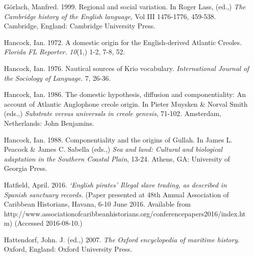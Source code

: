 \begin{styleStandard}
Görlach, Manfred. 1999.\textit{ }Regional and social variation.\textit{ }In Roger Lass, (ed.,)\textit{ The Cambridge} \textit{history of the English language, }Vol III\textit{ }1476-1776\textit{, }459-538.\textit{ }Cambridge, England: Cambridge University Press.
\end{styleStandard}


\begin{styleStandard}
Hancock, Ian. 1972. A domestic origin for the English-derived Atlantic Creoles. \textit{Florida FL Reporter. 10}(1,) 1-2, 7-8, 52.
\end{styleStandard}


\begin{styleStandard}
Hancock, Ian. 1976. Nautical sources of Krio vocabulary. \textit{International Journal of the} \textit{Sociology of Language. }7, 26-36.
\end{styleStandard}


\begin{styleStandard}
Hancock, Ian. 1986. The domestic hypothesis, diffusion and componentiality: An account of Atlantic Anglophone creole origin. In Pieter Muysken \& Norval Smith (eds.,) \textit{Substrate versus universals in creole genesis}, 71-102\textit{. }Amsterdam, Netherlands: John Benjamins.
\end{styleStandard}


\begin{styleStandard}
Hancock, Ian. 1988. Componentiality and the origins of Gullah. In James L. Peacock \& James C. Sabella (eds.,) \textit{Sea and land: Cultural and biological adaptation in the Southern Coastal Plain}, 13-24\textit{. }Athens, GA: University of Georgia Press.
\end{styleStandard}


\begin{styleStandard}
Hatfield, April. 2016. \textit{‘English pirates’ Illegal slave trading, as described in Spanish sanctuary records. }(Paper presented at 48th Annual Association of Caribbean Historians, Havana, 6-10 June 2016. Available from http://www.associationofcaribbeanhistorians.org/conferencepapers2016/index.htm) (Accessed 2016-08-10.)
\end{styleStandard}


\begin{styleStandard}
Hattendorf, John. J. (ed.,) 2007. \textit{The Oxford encyclopedia of maritime history}. Oxford, England: Oxford University Press. 
\end{styleStandard}



